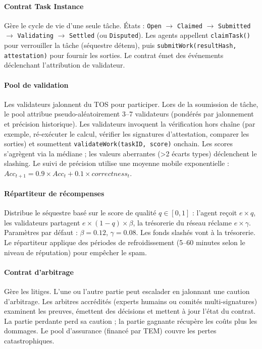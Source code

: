 \documentclass[11pt]{article}
\begin{document}
\paragraph{Contrat Task Instance} Gère le cycle de vie d'une seule tâche. États : \texttt{Open} $\rightarrow$ \texttt{Claimed} $\rightarrow$ \texttt{Submitted} $\rightarrow$ \texttt{Validating} $\rightarrow$ \texttt{Settled} (ou \texttt{Disputed}). Les agents appellent \texttt{claimTask()} pour verrouiller la tâche (séquestre détenu), puis \texttt{submitWork(resultHash, attestation)} pour fournir les sorties. Le contrat émet des événements déclenchant l'attribution de validateur.

\paragraph{Pool de validation} Les validateurs jalonnent du TOS pour participer. Lors de la soumission de tâche, le pool attribue pseudo-aléatoirement 3--7 validateurs (pondérés par jalonnement et précision historique). Les validateurs invoquent la vérification hors chaîne (par exemple, ré-exécuter le calcul, vérifier les signatures d'attestation, comparer les sorties) et soumettent \texttt{validateWork(taskID, score)} onchain. Les scores s'agrègent via la médiane ; les valeurs aberrantes (>2 écarts types) déclenchent le slashing. Le suivi de précision utilise une moyenne mobile exponentielle : $Acc_{t+1} = 0.9 \times Acc_t + 0.1 \times correctness_t$.

\paragraph{Répartiteur de récompenses} Distribue le séquestre basé sur le score de qualité $q \in [0,1]$ : l'agent reçoit $e \times q$, les validateurs partagent $e \times (1-q) \times \beta$, la trésorerie du réseau réclame $e \times \gamma$. Paramètres par défaut : $\beta=0.12$, $\gamma=0.08$. Les fonds slashés vont à la trésorerie. Le répartiteur applique des périodes de refroidissement (5--60 minutes selon le niveau de réputation) pour empêcher le spam.

\paragraph{Contrat d'arbitrage} Gère les litiges. L'une ou l'autre partie peut escalader en jalonnant une caution d'arbitrage. Les arbitres accrédités (experts humains ou comités multi-signatures) examinent les preuves, émettent des décisions et mettent à jour l'état du contrat. La partie perdante perd sa caution ; la partie gagnante récupère les coûts plus les dommages. Le pool d'assurance (financé par TEM) couvre les pertes catastrophiques.
\end{document}
